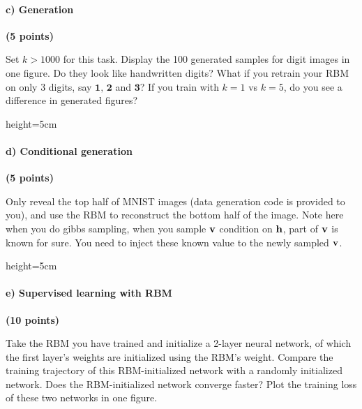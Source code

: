 
\paragraph{c) Generation} \textbf{(5 points)}

Set $k>1000$ for this task. Display the 100 generated samples for digit images in one figure. Do they look like handwritten digits? What if you retrain your RBM on only 3 digits, say $\textbf{1, 2}$ and $\textbf{3}$? If you train with $k=1$ vs $k=5$, do you see a difference in generated figures?

\begin{soln}{height=5cm}
\end{soln}

\paragraph{d) Conditional generation} \textbf{(5 points)}

Only reveal the top half of MNIST images (data generation code is provided to you), and use the RBM to reconstruct the bottom half of the image. Note here when you do gibbs sampling, when you sample $\bf v$ condition on $\bf h$, part of $\bf v$ is known for sure. You need to inject these known value to the newly sampled $\bf v$. 

\begin{soln}{height=5cm}
\end{soln}

\paragraph{e) Supervised learning with RBM} \textbf{(10 points)}

Take the RBM you have trained and initialize a 2-layer neural network, of which the first layer's weights are initialized using the RBM's weight. Compare the training trajectory of this RBM-initialized network with a randomly initialized network. Does the RBM-initialized network converge faster? Plot the training loss of these two networks in one figure.

